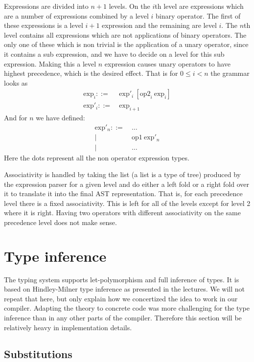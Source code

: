 \documentclass{scrartcl}
\begin{document}
Expressions are divided into $n + 1$ levels. On the $i$th level are 
expressions which are a number of expressions combined by a level
$i$ binary operator. The first of these expressions is a level
$i+1$ expression
and the remaining are level $i$. The $n$th level contains all 
expressions which are not applications of binary operators.
The only one of these which is non trivial is the application of a
unary operator,
since it contains a sub expression, and we have to decide on a
level for this sub expression. Making this a level $n$ expression
causes unary operators to have highest precedence, which is the
desired effect.
That is for $0 \leq i < n$ the grammar looks as
\begin{align*}
\text{exp}_i ::=&\ \text{exp}'_i\ [ \text{op2}_i\ \text{exp}_i ] \\
\text{exp}'_i ::=&\ \text{exp}_{i+1} 
\end{align*}
And for $n$ we have defined:
\begin{align*}
\text{exp}'_{n} ::=&\ \ldots \\
    | &\ \text{op1}\ \text{exp}'_{n} \\
    | &\ \ldots
\end{align*}
Here the dots represent all the non operator expression types.

Associativity is handled by taking the list (a list is a type of tree)
produced by the expression parser for a given level and do either
a left fold or a right fold over it to translate it into the final
AST representation. That is, for each precedence level there is a
fixed associativity. This is left for all of the levels except for
level 2 where it is right. Having two operators with different
associativity on the same precedence level does not make sense.

\section{Type inference}
The typing system supports let-polymorphism and full inference of types.
It is based on Hindley-Milner type inference as presented in the
lectures. We will not repeat that here, but only explain how we 
concertized the idea to work in our compiler. Adapting the theory
to concrete code was more challenging for the type inference than
in any other parts of the compiler.
Therefore this section will
be relatively heavy in implementation details.

\subsection{Substitutions}
\end{document}

